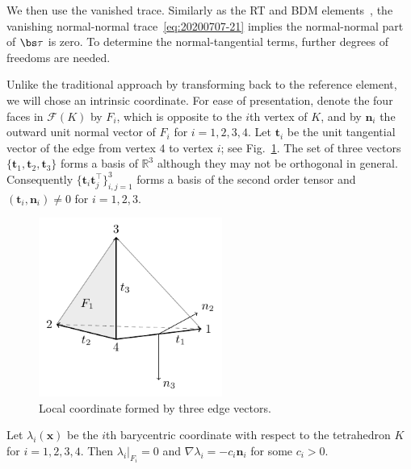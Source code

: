 We then use the vanished trace. Similarly as the RT and BDM elements~\cite{BoffiBrezziFortin2013},  the vanishing normal-normal trace~\eqref{eq:20200707-21} implies the normal-normal part of $\bs\tau$ is zero. To determine the normal-tangential terms, further degrees of freedoms are needed. 

Unlike the traditional approach by transforming back to the reference element, we will chose an intrinsic coordinate. For ease of presentation, denote the four faces in $\mathcal F(K)$ by $F_i$, which is opposite to the $i$th vertex of $K$, and by $\boldsymbol n_i$ the outward unit normal vector of $F_i$ for $i=1,2,3,4$. 
Let $\boldsymbol t_i$ be the unit tangential vector of the edge from vertex $4$ to vertex $i$; see Fig.~\ref{fig:localcoor}. 
The set of three vectors $\{\boldsymbol t_1, \boldsymbol t_2, \boldsymbol t_3\}$ forms a basis of $\mathbb R^3$ although they may not be orthogonal in general. Consequently $\{\boldsymbol t_i\boldsymbol t_j^{\intercal}\}_{i,j=1}^3$ forms a basis of the second order tensor and $(\boldsymbol t_i, \boldsymbol n_i) \neq 0$ for $i=1,2,3$.
\begin{figure}[htbp]
\begin{center}
\includegraphics[width=6cm]{figures/tet.pdf}
\caption{Local coordinate formed by three edge vectors.}
\label{fig:localcoor}
\end{center}
\end{figure}
Let $\lambda_i(\boldsymbol x)$ be the $i$th barycentric coordinate with respect to the tetrahedron $K$ for $i=1,2,3,4$. Then $\lambda_i|_{F_i} = 0$ and $\nabla \lambda_i = - c_i \boldsymbol n_i$ for some $c_i>0$.

